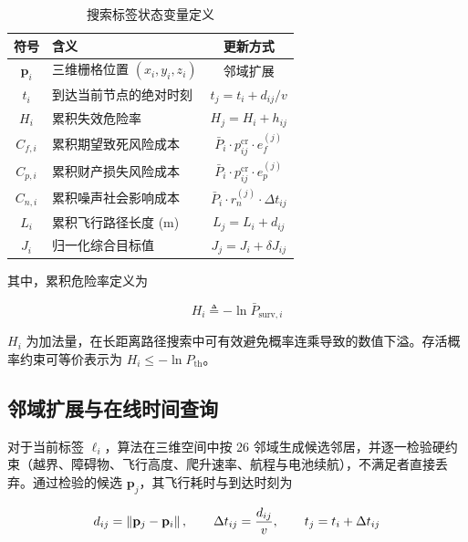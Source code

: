\begin{table}[htbp]
\centering
\caption{搜索标签状态变量定义}
\label{tab:state_variables}
\renewcommand{\arraystretch}{1.25}
\begin{tabular}{c p{5.2cm} c}
\toprule
符号 & 含义 & 更新方式 \\
\midrule
$\mathbf{p}_i$ & 三维栅格位置 $(x_i,y_i,z_i)$ & 邻域扩展 \\
$t_i$         & 到达当前节点的绝对时刻          & $t_j = t_i + d_{ij}/v$ \\
$H_i$         & 累积失效危险率 & $H_j = H_i + h_{ij}$ \\
$C_{f,i}$     & 累积期望致死风险成本            & $\bar{P}_i \cdot p_{ij}^{\mathrm{cr}} \cdot e_f^{(j)}$ \\
$C_{p,i}$     & 累积财产损失风险成本            & $\bar{P}_i \cdot p_{ij}^{\mathrm{cr}} \cdot e_p^{(j)}$ \\
$C_{n,i}$     & 累积噪声社会影响成本            & $\bar{P}_i \cdot r_n^{(j)} \cdot \Delta t_{ij}$ \\
$L_i$         & 累积飞行路径长度 (m)            & $L_j = L_i + d_{ij}$ \\
$J_i$         & 归一化综合目标值                & $J_j = J_i + \delta J_{ij}$ \\
\bottomrule
\end{tabular}
\end{table}

其中，累积危险率定义为

\begin{equation}
H_i \triangleq -\ln \bar{P}_{\mathrm{surv},i}
\label{eq:cumulative_hazard}
\end{equation}

$H_i$ 为加法量，在长距离路径搜索中可有效避免概率连乘导致的数值下溢。存活概率约束可等价表示为 $H_i \leq -\ln P_{\mathrm{th}}$。

\subsection{邻域扩展与在线时间查询}
\label{subsec:expansion_and_risk}

对于当前标签 $\ell_i$，算法在三维空间中按 26 邻域生成候选邻居，并逐一检验硬约束（越界、障碍物、飞行高度、爬升速率、航程与电池续航），不满足者直接丢弃。通过检验的候选 $\mathbf{p}_j$，其飞行耗时与到达时刻为

\begin{equation}
d_{ij} = \left\lVert\mathbf{p}_j - \mathbf{p}_i\right\rVert, \qquad
\Delta t_{ij} = \frac{d_{ij}}{v}, \qquad
t_j = t_i + \Delta t_{ij}
\label{eq:time_advance}
\end{equation}

